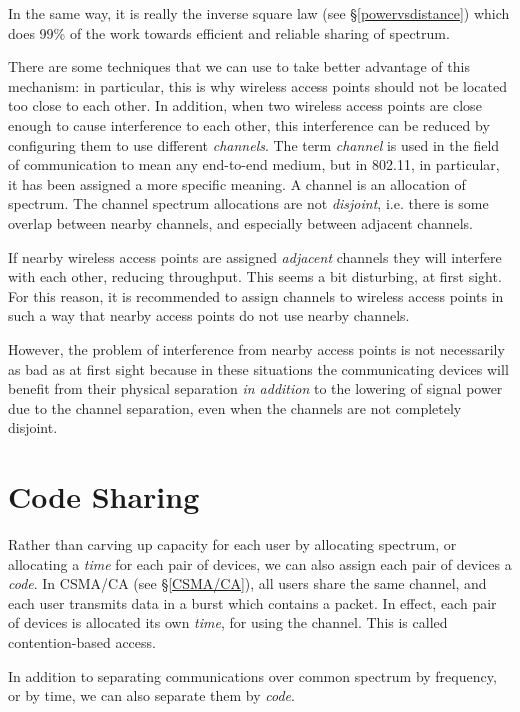 In the same way, it is really the inverse square law (see \S\ref{powervsdistance}) which 
does 99\% of the work towards efficient and reliable sharing of spectrum.

There are some techniques that we can use to take better advantage of this mechanism:
in particular, this is why wireless access points should not be located too close
to each other. In addition, when two wireless access points are close enough
to cause interference to each other, this interference can be reduced by 
configuring them to use different {\em channels}. The term {\em channel} is
used in the field of communication to mean any end-to-end medium, but in 
802.11, in particular, it has been assigned a more specific meaning. A channel
is an allocation of spectrum. The channel spectrum allocations are not
{\em disjoint}, i.e. there is some overlap between nearby channels, and
especially between adjacent channels.

If nearby wireless access points are assigned {\em adjacent} channels
they will interfere with each other, reducing throughput. This seems a bit disturbing,
at first sight. For this reason, it is recommended to assign channels to wireless
access points in such a way that nearby access points do not use nearby channels.

However, the problem of interference from nearby access points is not necessarily
as bad as at first sight because in these situations the communicating devices
will benefit from their physical separation {\em in addition} to the lowering
of signal power due to the channel separation, even when the channels are not
completely disjoint.

\section{Code Sharing}

Rather than carving up capacity for each user by allocating spectrum, or 
allocating a {\em time} for each pair of devices, 
we can also assign each pair of devices a {\em code}. In CSMA/CA (see \S\ref{CSMA/CA}),
all users share the same channel, and each user transmits data
in a burst which contains a packet. In effect, each pair of devices is
allocated its own {\em time}, for using the channel. This is called contention-based 
access. 

In addition to separating communications over common spectrum by frequency,
or by time, we can also separate them by {\em code}. 

